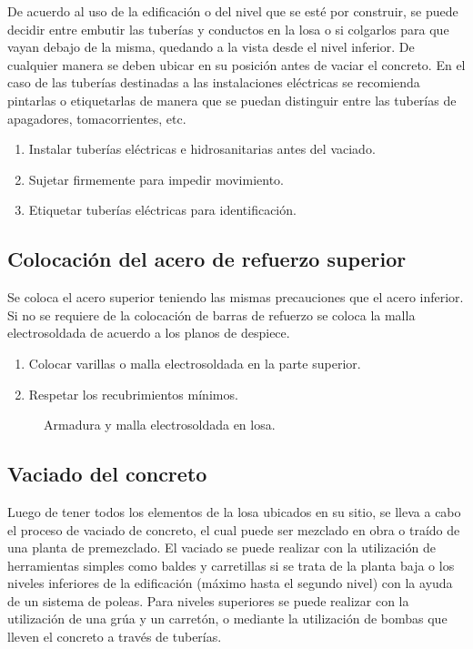 \documentclass[12pt]{article}
\begin{document}
		De acuerdo al uso de la edificación o del nivel que se esté por construir, se puede
		decidir entre embutir las tuberías y conductos en la losa o si colgarlos para que
		vayan debajo de la misma, quedando a la vista desde el nivel inferior. De cualquier
		manera se deben ubicar en su posición antes de vaciar el concreto. En el caso de
		las tuberías destinadas a las instalaciones eléctricas se recomienda pintarlas o
		etiquetarlas de manera que se puedan distinguir entre las tuberías de apagadores,
		tomacorrientes, etc.
		
	\begin{enumerate}
		\item Instalar tuberías eléctricas e hidrosanitarias antes del vaciado.
		\item Sujetar firmemente para impedir movimiento.
		\item Etiquetar tuberías eléctricas para identificación.
	\end{enumerate}
	
	\subsection{Colocación del acero de refuerzo superior}
	Se coloca el acero superior teniendo las mismas precauciones que el acero
	inferior. Si no se requiere de la colocación de barras de refuerzo se coloca la malla
	electrosoldada de acuerdo a los planos de despiece.
	
	\begin{enumerate}
		\item Colocar varillas o malla electrosoldada en la parte superior.
		\item Respetar los recubrimientos mínimos.
	\end{enumerate}
	
	\begin{figure}[h]
		\centering
		\caption{Armadura y malla electrosoldada en losa.}
	\end{figure}
	
	\subsection{Vaciado del concreto}
	Luego de tener todos los elementos de la losa ubicados en su sitio, se lleva a cabo
	el proceso de vaciado de concreto, el cual puede ser mezclado en obra o traído de
	una planta de premezclado.
	El vaciado se puede realizar con la utilización de herramientas simples como
	baldes y carretillas si se trata de la planta baja o los niveles inferiores de la
	edificación (máximo hasta el segundo nivel) con la ayuda de un sistema de poleas.
	Para niveles superiores se puede realizar con la utilización de una grúa y un
	carretón, o mediante la utilización de bombas que lleven el concreto a través de
	tuberías.
	
\end{document}
